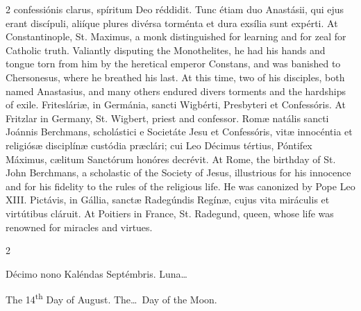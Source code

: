 \begin{paracol}{2}
 confessiónis clarus, spíritum Deo réddidit. Tunc étiam duo Anastásii, 
 qui ejus erant discípuli, aliíque plures divérsa torménta et dura exsília 
 sunt expérti.
\switchcolumn
{}
At Constantinople, St. Maximus, a 
 monk distinguished for learning and for zeal for Catholic truth. 
 Valiantly disputing the Monothelites, he had his hands and tongue torn from 
 him by the heretical emperor Constans, and was banished to Chersonesus, 
 where he breathed his last. At this time, two of his disciples, both 
 named Anastasius, and many others endured divers torments and the hardships 
 of exile.
\switchcolumn*
{}
Fritesláriæ, in 
 Germánia, sancti Wigbérti, Presbyteri et Confessóris.
\switchcolumn
{}
At Fritzlar in Germany, St. Wigbert, 
 priest and confessor.
\switchcolumn*
{}
Romæ natális sancti 
 Joánnis Berchmans, scholástici e Societáte Jesu et Confessóris, vitæ 
 innocéntia et religiósæ disciplínæ custódia præclári; cui Leo Décimus 
 tértius, Póntifex Máximus, cælitum Sanctórum honóres decrévit.
\switchcolumn
{}
At Rome, the birthday of St. John 
 Berchmans, a scholastic of the Society of Jesus, illustrious for his 
 innocence and for his fidelity to the rules of the religious life. He 
 was canonized by Pope Leo XIII.
\switchcolumn*
{}
Pictávis, in Gállia, 
 sanctæ Radegúndis Regínæ, cujus vita miráculis et virtútibus cláruit.
\switchcolumn
{}
At Poitiers in France, St. Radegund, 
 queen, whose life was renowned for miracles and virtues.
\switchcolumn*
{}
\end{paracol}


\begin{paracol}{2}
\begin{center}{\color{gregoriocolor} Décimo nono Kaléndas Septémbris. 
 Luna\dots\ }\end{center}
\switchcolumn
{}
\begin{center}{\color{gregoriocolor} The 
 14\textsuperscript{th} Day of 
 August. The\dots\ Day of the Moon.}\end{center}
\end{paracol}

